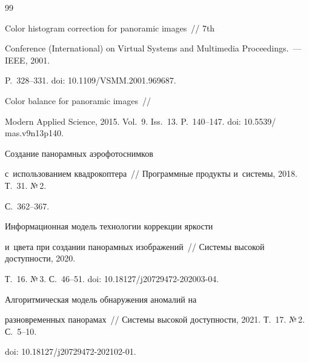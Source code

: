 {\small\frenchspacing


{%




\begin{thebibliography}{99}







 Color histogram correction for panoramic images~/\!\!/ 7th  


Conference (International) on Virtual Systems and Multimedia Proceedings.~--- IEEE, 2001.  


P.~328--331. doi: 10.1109\!/\!VSMM.2001.969687.




 Color balance for panoramic images~/\!\!/ 


Modern Applied Science, 2015. Vol.~9. Iss.~13. P.~140--147. doi: 10.5539\!/ mas.v9n13p140.







 Создание панорамных аэрофотоснимков 


с~использованием квадрокоптера~/\!\!/ Программные продукты и~системы, 2018. Т.~31. №\,2. 


С.~362--367.







 Информационная модель технологии коррекции яркости 


и~цвета при создании панорамных изображений~/\!\!/ Системы высокой доступности, 2020. 


Т.~16. №\,3. С.~46--51. doi: 10.18127\!/\!j20729472-202003-04.







 Алгоритмическая модель обнаружения аномалий на 


разновременных панорамах~/\!\!/ Системы высокой доступности, 2021. Т.~17. №\,2. С.~5--10. 


doi: 10.18127\!/\!j20729472-202102-01.



\end{thebibliography}}}
